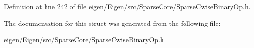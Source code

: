 Definition at line \hyperlink{eigen_2_eigen_2src_2_sparse_core_2_sparse_cwise_binary_op_8h_source_l00242}{242} of file \hyperlink{eigen_2_eigen_2src_2_sparse_core_2_sparse_cwise_binary_op_8h_source}{eigen/\+Eigen/src/\+Sparse\+Core/\+Sparse\+Cwise\+Binary\+Op.\+h}.



The documentation for this struct was generated from the following file\+:\begin{DoxyCompactItemize}
\item 
eigen/\+Eigen/src/\+Sparse\+Core/\+Sparse\+Cwise\+Binary\+Op.\+h\end{DoxyCompactItemize}

